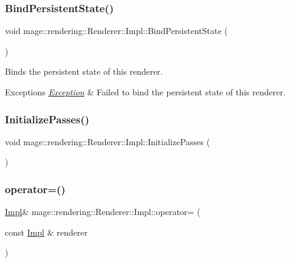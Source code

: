 \subsubsection{\texorpdfstring{Bind\+Persistent\+State()}{BindPersistentState()}}
{\footnotesize\ttfamily void mage\+::rendering\+::\+Renderer\+::\+Impl\+::\+Bind\+Persistent\+State (\begin{DoxyParamCaption}{ }\end{DoxyParamCaption})}

Binds the persistent state of this renderer.


\begin{DoxyExceptions}{Exceptions}
{\em \mbox{\hyperlink{classmage_1_1_exception}{Exception}}} & Failed to bind the persistent state of this renderer. \\
\hline
\end{DoxyExceptions}
\mbox{\label{classmage_1_1rendering_1_1_renderer_1_1_impl_a0db15a325a2e2242a76323b27acec12f}} 
\subsubsection{\texorpdfstring{Initialize\+Passes()}{InitializePasses()}}
{\footnotesize\ttfamily void mage\+::rendering\+::\+Renderer\+::\+Impl\+::\+Initialize\+Passes (\begin{DoxyParamCaption}{ }\end{DoxyParamCaption})\hspace{0.3cm}{\ttfamily [private]}}

\mbox{\label{classmage_1_1rendering_1_1_renderer_1_1_impl_a8eef87ba80c22cba7a2d83db9a740188}} 
\subsubsection{\texorpdfstring{operator=()}{operator=()}\hspace{0.1cm}{\footnotesize\ttfamily [1/2]}}
{\footnotesize\ttfamily \mbox{\hyperlink{classmage_1_1rendering_1_1_renderer_1_1_impl}{Impl}}\& mage\+::rendering\+::\+Renderer\+::\+Impl\+::operator= (\begin{DoxyParamCaption}\item[{const \mbox{\hyperlink{classmage_1_1rendering_1_1_renderer_1_1_impl}{Impl}} \&}]{renderer }\end{DoxyParamCaption})\hspace{0.3cm}{\ttfamily [delete]}}

